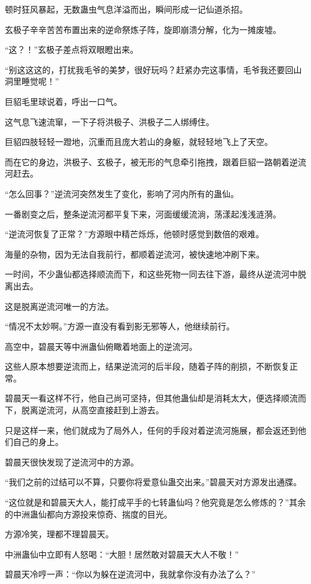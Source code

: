 \begin{this_body}
顿时狂风暴起，无数蛊虫气息洋溢而出，瞬间形成一记仙道杀招。

玄极子辛辛苦苦布置出来的逆命祭炼子阵，旋即崩溃分解，化为一摊废墟。

“这？！”玄极子差点将双眼瞪出来。

“别这这这的，打扰我毛爷的美梦，很好玩吗？赶紧办完这事情，毛爷我还要回山洞里睡觉呢！”

巨貂毛里球说着，呼出一口气。

这气息飞速流窜，一下子将洪极子、洪极子二人绑缚住。

巨貂四肢轻轻一蹬地，沉重而且庞大若山的身躯，就轻轻地飞上了天空。

而在它的身边，洪极子、玄极子，被无形的气息牵引拖拽，跟着巨貂一路朝着逆流河赶去。

“怎么回事？”逆流河突然发生了变化，影响了河内所有的蛊仙。

一番剧变之后，整条逆流河都平复下来，河面缓缓流淌，荡漾起浅浅涟漪。

“逆流河恢复了正常？”方源眼中精芒烁烁，他顿时感觉到数倍的艰难。

海量的杂物，因为无法自我前行，都顺着逆流河，被快速地冲刷下来。

一时间，不少蛊仙都选择顺流而下，和这些死物一同去往下游，最终从逆流河中脱离出去。

这是脱离逆流河唯一的方法。

“情况不太妙啊。”方源一直没有看到影无邪等人，他继续前行。

高空中，碧晨天等中洲蛊仙俯瞰着地面上的逆流河。

这些人原本想要逆流而上，结果逆流河的后半段，随着子阵的削损，不断恢复正常。

碧晨天一看这样不行，他自己尚可坚持，但其他蛊仙却是消耗太大，便选择顺流而下，脱离逆流河，从高空直接赶到上游去。

只是这样一来，他们就成为了局外人，任何的手段对着逆流河施展，都会返还到他们自己的身上。

碧晨天很快发现了逆流河中的方源。

“我们之前的过结可以不算，只要你将爱意仙蛊交出来。”碧晨天对方源发出通牒。

“这位就是和碧晨天大人，能打成平手的七转蛊仙吗？他究竟是怎么修炼的？”其余的中洲蛊仙都向方源投来惊奇、揣度的目光。

方源冷笑，理都不理碧晨天。

中洲蛊仙中立即有人怒喝：“大胆！居然敢对碧晨天大人不敬！”

碧晨天冷哼一声：“你以为躲在逆流河中，我就拿你没有办法了么？”


\end{this_body}
